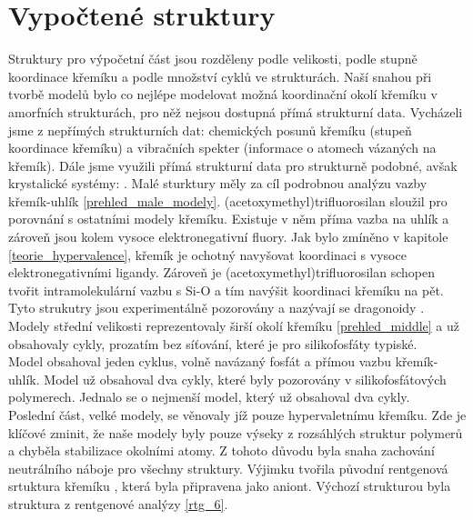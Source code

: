\documentclass[
  digital, %
  table,   %
  lof,     %
  lot,     %
  oneside,
]{fithesis3}
\begin{document}
\section{Vypočtené struktury}
Struktury pro výpočetní část jsou rozděleny podle velikosti, podle stupně koordinace křemíku a podle množství cyklů ve strukturách. Naší snahou při tvorbě modelů bylo co nejlépe modelovat možná koordinační okolí křemíku v amorfních strukturách, pro něž nejsou dostupná přímá strukturní data. Vycházeli jsme z nepřímých strukturních dat: chemických posunů křemíku (stupeň koordinace křemíku) a vibračních spekter (informace o atomech vázaných na křemík). Dále jsme využili přímá strukturní data pro strukturně podobné, avšak krystalické systémy: \cite{C3NJ00721A} \cite{rtg_4_pinkas}. Malé sturktury měly za cíl podrobnou analýzu vazby křemík-uhlík \ref{prehled_male_modely}. (acetoxymethyl)trifluorosilan sloužil pro porovnání s ostatními modely křemíku. Existuje v něm příma vazba na uhlík a zároveň jsou kolem vysoce elektronegativní fluory. Jak bylo zmíněno v kapitole \ref{teorie_hypervalence}, křemík je ochotný navyšovat koordinaci s vysoce elektronegativními ligandy. Zároveň je (acetoxymethyl)trifluorosilan schopen tvořit intramolekulární vazbu s Si-O a tím navýšit koordinaci křemíku na pět. Tyto strukutry jsou experimentálně pozorovány a nazývají se dragonoidy \cite{Chipanina2011}. Modely střední velikosti reprezentovaly širší okolí křemíku \ref{prehled_middle} a už obsahovaly cykly, prozatím bez síťování, které je pro silikofosfáty typiské. \\
Model  obsahoval jeden cyklus, volně navázaný fosfát a přímou vazbu křemík-uhlík. Model  už obsahoval dva cykly, které byly pozorovány v silikofosfátových polymerech. Jednalo se o nejmenší model, který už obsahoval dva cykly.\\
Poslední část, velké modely, se věnovaly jíž pouze hypervaletnímu křemíku. Zde je klíčové zminit, že naše modely byly pouze výseky z rozsáhlých struktur polymerů a chyběla stabilizace okolními atomy. Z tohoto důvodu byla snaha zachování neutrálního náboje pro všechny struktury. Výjimku tvořila původní rentgenová srtuktura křemíku \cite{C3NJ00721A}, která byla připravena jako aniont. Výchozí strukturou byla struktura z rentgenové analýzy \cite{C3NJ00721A} \ref{rtg_6}.
\end{document}
